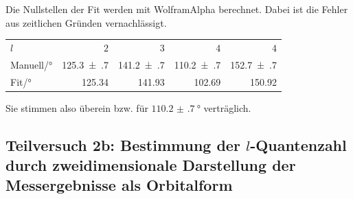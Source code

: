 		Die Nullstellen der Fit werden mit WolframAlpha berechnet. Dabei ist die Fehler aus zeitlichen Gründen vernachlässigt.
		\begin{center}
			\begin{tabular}{lrrrr}
				\toprule
				$l$ & $2$ & $3$ & $4$ & $4$ \\
				Manuell/\si{\degree} & \num{125.3(7)} & \num{141.2(7)} & \num{110.2(7)} & \num{152.7(7)} \\
				Fit/\si{\degree}     & \num{125.34}   & \num{141.93}   & \num{102.69}   & \num{150.92} \\
				\bottomrule
			\end{tabular}
		\end{center}
		Sie stimmen also überein bzw. für $\SI{110.2(7)}{\degree}$ verträglich.


	\subsection{Teilversuch 2b: Bestimmung der $l$-Quantenzahl durch zweidimensionale Darstellung der Messergebnisse als Orbitalform}
